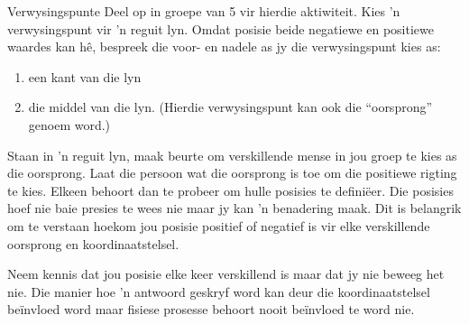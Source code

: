 \begin{groupdiscussion}{Verwysingspunte}
            \nopagebreak
Deel op in groepe van 5 vir hierdie aktiwiteit. Kies 'n verwysingspunt vir 'n reguit lyn. Omdat posisie beide negatiewe en positiewe waardes kan h\^e, bespreek die voor- en nadele as jy die verwysingspunt kies as:
\begin{enumerate}[noitemsep, label=\textbf{\arabic*}. ] 
    \item een kant van die lyn
    \item die middel van die lyn. (Hierdie verwysingspunt kan ook die ``oorsprong'' genoem word.)
\end{enumerate}
Staan in 'n reguit lyn, maak beurte om verskillende mense in jou groep te kies as die oorsprong. Laat die persoon wat die oorsprong is toe om die positiewe rigting te kies. Elkeen behoort dan te probeer om hulle posisies te defini\"eer. Die posisies hoef nie baie presies te wees nie maar jy kan 'n benadering maak. Dit is belangrik om te verstaan hoekom jou posisie positief of negatief is vir elke verskillende oorsprong en koordinaatstelsel.

Neem kennis dat jou posisie elke keer verskillend is maar dat jy nie beweeg het nie. Die manier hoe 'n antwoord geskryf word kan deur die koordinaatstelsel be\"invloed word maar fisiese prosesse behoort nooit be\"invloed te word nie.
\end{groupdiscussion}

